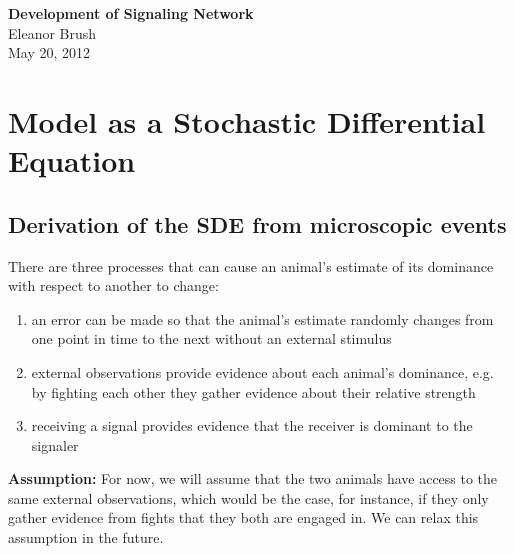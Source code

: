 \documentclass{article}
\begin{document}
\begin{center}
\Large

\end{center}


\vspace{0pt}

\begin{center}
{\bf Development of Signaling Network}
\\ Eleanor Brush
\\ May 20, 2012
\end{center}

\vspace{0pt}
\normalsize
\section{Model as a Stochastic Differential Equation}

\subsection{Derivation of the SDE from microscopic events }
There are three processes that can cause an animal's estimate of its dominance with respect to another to change:
\begin{enumerate}
\item an error can be made so that the animal's estimate randomly changes from one point in time to the next without an external stimulus

\item external observations provide evidence about each animal's dominance, e.g. by fighting each other they gather evidence about their relative strength

\item receiving a signal provides evidence that the receiver is dominant to the signaler

\end{enumerate}
{\bf Assumption:} For now, we will assume that the two animals have access to the same external observations, which would be the case, for instance, if they only gather evidence from fights that they both are engaged in.  We can relax this assumption in the future.
\end{document}
